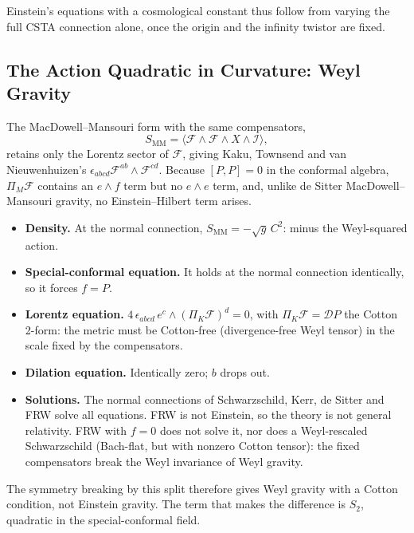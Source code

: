 \documentclass[11pt,a4paper]{article}
\newcommand{\D}{\mathcal{D}}
\newcommand{\F}{\mathcal{F}}
\begin{document}
Einstein's equations with a cosmological constant thus follow from
varying the full CSTA connection alone, once the origin and the
infinity twistor are fixed.

\subsection{The Action Quadratic in Curvature: Weyl Gravity}

The MacDowell--Mansouri form with the same compensators,
\[
    \boxed{
        S_{\mathrm{MM}}=\bigl\langle\F\wedge\F\wedge X\wedge\mathcal I
        \bigr\rangle,
    }
\]
retains only the Lorentz sector of \(\F\), giving Kaku, Townsend and
van Nieuwenhuizen's \(\epsilon_{abcd}\F^{ab}\wedge\F^{cd}\). Because
\([P,P]=0\) in the conformal algebra, \(\Pi_M\F\) contains an
\(e\wedge f\) term but no \(e\wedge e\) term, and, unlike de Sitter
MacDowell--Mansouri gravity, no Einstein--Hilbert term arises.

\begin{itemize}
    \item \textbf{Density.} At the normal connection,
    \(S_{\mathrm{MM}}=-\sqrt g\,C^2\): minus the Weyl-squared action.

    \item \textbf{Special-conformal equation.} It holds at the normal
    connection identically, so it forces \(f=P\).

    \item \textbf{Lorentz equation.}
    \(4\,\epsilon_{abcd}\,e^c\wedge(\Pi_K\F)^d=0\), with
    \(\Pi_K\F=\D P\) the Cotton 2-form: the metric must be Cotton-free
    (divergence-free Weyl tensor) in the scale fixed by the
    compensators.

    \item \textbf{Dilation equation.} Identically zero; \(b\) drops
    out.

    \item \textbf{Solutions.} The normal connections of Schwarzschild,
    Kerr, de Sitter and FRW solve all equations. FRW is not Einstein,
    so the theory is not general relativity. FRW with \(f=0\) does not
    solve it, nor does a Weyl-rescaled Schwarzschild (Bach-flat, but
    with nonzero Cotton tensor): the fixed compensators break the Weyl
    invariance of Weyl gravity.
\end{itemize}

The symmetry breaking by this split therefore gives Weyl gravity with
a Cotton condition, not Einstein gravity. The term that makes the
difference is \(S_2\), quadratic in the special-conformal field.
\end{document}
